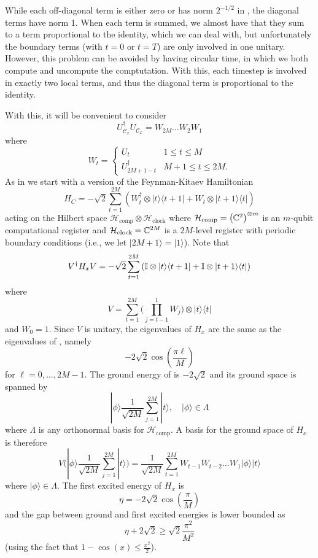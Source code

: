 \documentclass[../thesis-main/thesis-main]{subfiles}
\begin{document}
While each off-diagonal term is either zero or has norm $2^{-1/2}$ in , the diagonal terms have norm 1.  When each term is summed, we almost have that they sum to a term proportional to the identity, which we can deal with, but unfortunately the boundary terms (with $t=0$ or $t=T$) are only involved in one unitary.  However, this problem can be avoided by having circular time, in which we both compute and uncompute the comptutation.  With this, each timestep is involved in exactly two local terms, and thus the diagonal term is proportional to the identity.

With this, it will be convenient to consider 
\begin{equation}
  U_{\mathcal{C}_{x}}^{\dagger}U_{\mathcal{C}_{x}}=W_{2M}\ldots W_{2}W_{1}
\end{equation}
where
\begin{equation}
W_{t}=\begin{cases}
U_{t} & 1\leq t\leq M\\
U_{2M+1-t}^{\dagger} & M+1 \le t \le 2M.
\end{cases}
\end{equation}
As in  we start with a version of the Feynman-Kitaev Hamiltonian \cite{Fey85,KSV02}
\begin{equation}
H_{C}=-\sqrt{2}\sum_{t=1}^{2M}\left(W_{t}^{\dagger}\otimes|t\rangle\langle t+1|+W_{t}\otimes|t+1\rangle\langle t|\right)\label{eq:H_x}
\end{equation}
acting on the Hilbert space $\mathcal{H}_{\text{comp}} \otimes \mathcal{H}_{\text{clock}}$ where $\mathcal{H}_{\text{comp}} = \left(\mathbb{C}^{2}\right)^{\otimes m}$ is an $m$-qubit computational register and $\mathcal{H}_{\text{clock}}=\mathbb{C}^{2M}$ is a $2M$-level register with periodic boundary conditions (i.e., we let $|2M+1\rangle=|1\rangle$). Note that 
\begin{equation}
V^{\dagger}H_{x}V=-\sqrt{2}\sum_{t=1}^{2M}\left(\mathbb{I}\otimes|t\rangle\langle t+1|+\mathbb{I}\otimes|t+1\rangle\langle t|\right)\label{eq:V_H_V}
\end{equation}
where 
\[
V=\sum_{t=1}^{2M}\bigg(\prod_{j=t-1}^{1}W_{j}\bigg)\otimes|t\rangle\langle t|
\]
and $W_{0}=1$. Since $V$ is unitary, the eigenvalues of $H_{x}$ are the same as the eigenvalues of , namely 
\[
-2\sqrt{2}\cos\left(\frac{\pi \ell}{M}\right)
\]
for $\ell=0,\ldots,2M-1$. The ground energy of  is $-2\sqrt{2}$ and its ground space is spanned by 
\[
  |\phi\rangle\frac{1}{\sqrt{2M}}\sum_{j=1}^{2M}|t\rangle,
  \quad|\phi\rangle\in\Lambda
\]
where $\Lambda$ is any orthonormal basis for $\mathcal{H}_{\mathrm{comp}}$. A basis for the ground space of $H_{x}$ is therefore 
\[
V\bigg(|\phi\rangle\frac{1}{\sqrt{2M}}\sum_{j=1}^{2M}|t\rangle\bigg)=\frac{1}{\sqrt{2M}}\sum_{t=1}^{2M}W_{t-1}W_{t-2}\ldots W_{1}|\phi\rangle|t\rangle
\]
 where $|\phi\rangle\in\Lambda$. The first excited energy of $H_{x}$ is 
\[
\eta=-2\sqrt{2}\cos\left(\frac{\pi}{M}\right)
\]
and the gap between ground and first excited energies is lower bounded as 
\begin{equation}
\eta+2\sqrt{2}\geq\sqrt{2}\frac{\pi^{2}}{M^{2}}\label{eq:bound_on_eta}
\end{equation}
(using the fact that $1-\cos(x)\leq\frac{x^{2}}{2}$).
\end{document}

